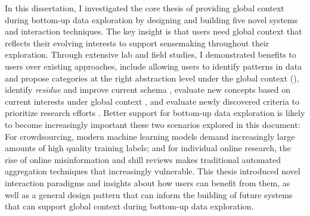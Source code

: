 In this dissertation, I investigated the core thesis of providing global context during bottom-up data exploration by designing and building five novel systems and interaction techniques. The key insight is that users need global context that reflects their evolving interests to support sensemaking throughout their exploration. Through extensive lab and field studies, I demonstrated benefits to users over existing approaches, include allowing users to identify patterns in data and propose categories at the right abstraction level under the global context (), identify \emph{residue} and improve current schema , evaluate new concepts based on current interests under global context , and evaluate newly discovered criteria to prioritize research efforts . Better support for bottom-up data exploration is likely to become increasingly important these two scenarios explored in this document:  For crowdsourcing, modern machine learning models demand increasingly large amounts of high quality training labels; and for individual online research, the rise of online misinformation and shill reviews makes traditional automated aggregation techniques that increasingly vulnerable. This thesis introduced novel interaction paradigms and insights about how users can benefit from them, as well as a general design pattern that can inform the building of future systems that can support global context during bottom-up data exploration.
